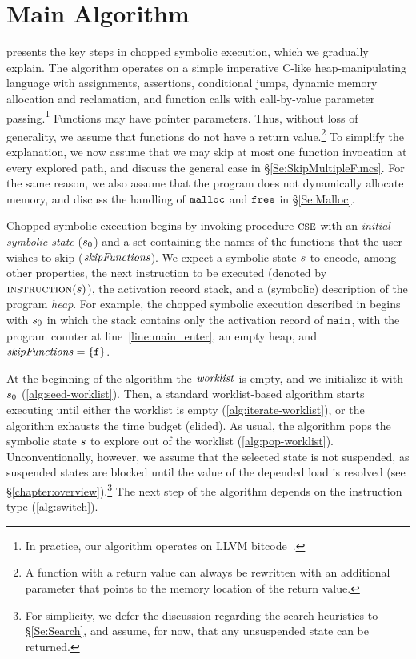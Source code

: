 

\section{Main Algorithm}



 presents the key steps in chopped
symbolic execution, which we gradually explain. The algorithm operates
on a simple imperative C-like heap-manipulating language with
assignments, assertions, conditional jumps, dynamic memory allocation
and reclamation, and function calls with call-by-value parameter
passing.\footnote{In practice, our algorithm operates on LLVM
  bitcode~\cite{llvm}.}  Functions may have pointer parameters. Thus,
without loss of generality, we assume that functions do not have a
return value.\footnote{A function with a return value can always be
  rewritten with an additional parameter that points to the memory
  location of the return value.}  To simplify the explanation, we now
assume that we may skip at most one function invocation at every
explored path, and discuss the general case in
\S\ref{Se:SkipMultipleFuncs}. For the same reason, we also assume that
the program does not dynamically allocate memory, and discuss the
handling of $\texttt{malloc}$ and $\texttt{free}$ in \S\ref{Se:Malloc}.

Chopped symbolic execution begins by invoking procedure $\textsc{cse}$
with an \emph{initial symbolic state} ($s_0$) and a set
containing the names of the functions that the user wishes to skip
($\mathit{skipFunctions}$). We expect a symbolic state $s$ to encode,
among other properties, the next instruction to be executed (denoted
by $\Call{instruction}{\workstate}$), the activation record stack, and
a (symbolic) description of the program \emph{heap}. For example, the
chopped symbolic execution described in  begins
with $s_0$ in which the stack contains only the activation record
of $\texttt{main}$, with the program counter at
line~\ref{line:main_enter}, an empty heap, and
$\mathit{skipFunctions} = \{ \texttt{f} \}$.

At the beginning of the algorithm the $\mathit{worklist}$ is empty, and we
initialize it with $s_0$ (\cref{alg:seed-worklist}). Then, a
standard worklist-based algorithm starts executing until either the
worklist is empty (\cref{alg:iterate-worklist}), or the algorithm
exhausts the time budget (elided). As usual, the algorithm pops the
symbolic state $s$ to explore out of the worklist
(\cref{alg:pop-worklist}). Unconventionally, however, we assume that
the selected state is not suspended, as suspended states are blocked
until the value of the depended load is resolved (see
\S\ref{chapter:overview}).\footnote{For simplicity, we defer the
  discussion regarding the search heuristics to \S\ref{Se:Search}, and
  assume, for now, that any unsuspended state can be returned.}  The
next step of the algorithm depends on the instruction type
(\cref{alg:switch}).


